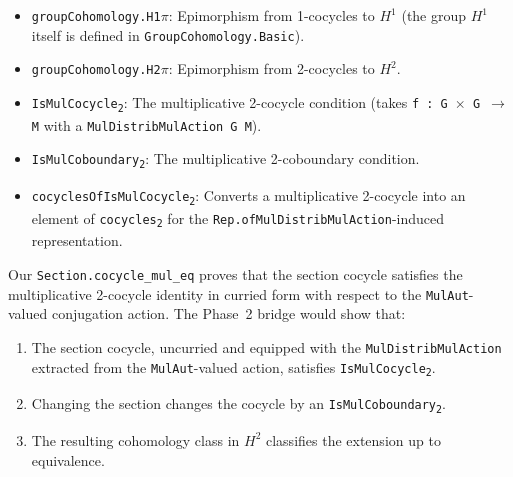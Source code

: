 \documentclass[11pt]{article}
\begin{document}
\begin{itemize}[nosep]
\item \texttt{groupCohomology.H1$\pi$}: Epimorphism from 1-cocycles to $H^1$ (the group
  $H^1$ itself is defined in \texttt{GroupCohomology.Basic}).
\item \texttt{groupCohomology.H2$\pi$}: Epimorphism from 2-cocycles to $H^2$.
\item \texttt{IsMulCocycle\textsubscript{2}}: The multiplicative 2-cocycle condition
  (takes \texttt{f : G $\times$ G $\to$ M} with a \texttt{MulDistribMulAction G M}).
\item \texttt{IsMulCoboundary\textsubscript{2}}: The multiplicative 2-coboundary condition.
\item \texttt{cocyclesOfIsMulCocycle\textsubscript{2}}: Converts a multiplicative 2-cocycle
  into an element of \texttt{cocycles\textsubscript{2}} for the
  \texttt{Rep.ofMulDistribMulAction}-induced representation.
\end{itemize}

Our \texttt{Section.cocycle\_mul\_eq} proves that the section cocycle satisfies
the multiplicative 2-cocycle identity in curried form with respect to the
\texttt{MulAut}-valued conjugation action. The Phase~2 bridge would show that:
\begin{enumerate}[nosep]
\item The section cocycle, uncurried and equipped with the
  \texttt{MulDistribMulAction} extracted from the \texttt{MulAut}-valued action,
  satisfies \texttt{IsMulCocycle\textsubscript{2}}.
\item Changing the section changes the cocycle by an
  \texttt{IsMulCoboundary\textsubscript{2}}.
\item The resulting cohomology class in $H^2$ classifies the extension up to equivalence.
\end{enumerate}
\end{document}
